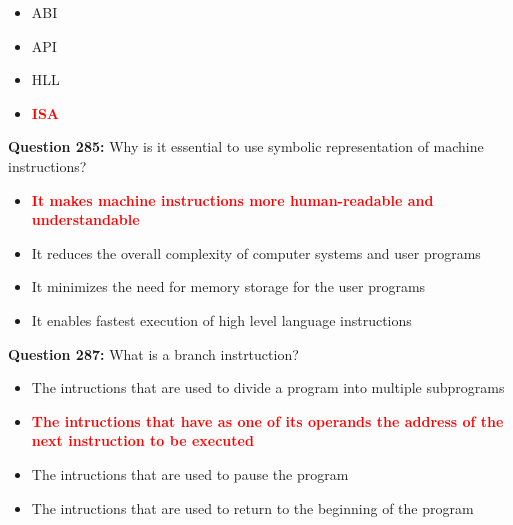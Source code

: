 \documentclass[12pt,a4paper]{article}
\begin{document}
\begin{itemize}
    \item[\textbf{A.}] ABI
    \item[\textbf{B.}] API
    \item[\textbf{C.}] HLL
    \item[\textbf{D.}] \textcolor{red}{\textbf{ISA}}
\end{itemize}

\vspace{0.5cm}

\vspace{0.5cm}

\textbf{Question 285:} Why is it essential to use symbolic representation of machine instructions?

\begin{itemize}
    \item[\textbf{A.}] \textcolor{red}{\textbf{It makes machine instructions more human-readable and understandable}}
    \item[\textbf{B.}] It reduces the overall complexity of computer systems and user programs
    \item[\textbf{C.}] It minimizes the need for memory storage for the user programs
    \item[\textbf{D.}] It enables fastest execution of high level language instructions
\end{itemize}

\vspace{0.5cm}

\vspace{0.5cm}

\textbf{Question 287:} What is a branch instrtuction?

\begin{itemize}
    \item[\textbf{A.}] The intructions that are used to divide a program into multiple subprograms
    \item[\textbf{B.}] \textcolor{red}{\textbf{The intructions that have as one of its operands the address of the next instruction to be executed}}
    \item[\textbf{C.}] The intructions that are used to pause the program
    \item[\textbf{D.}] The intructions that are used to return to the beginning of the program
\end{itemize}

\vspace{0.5cm}

\vspace{0.5cm}
\end{document}
